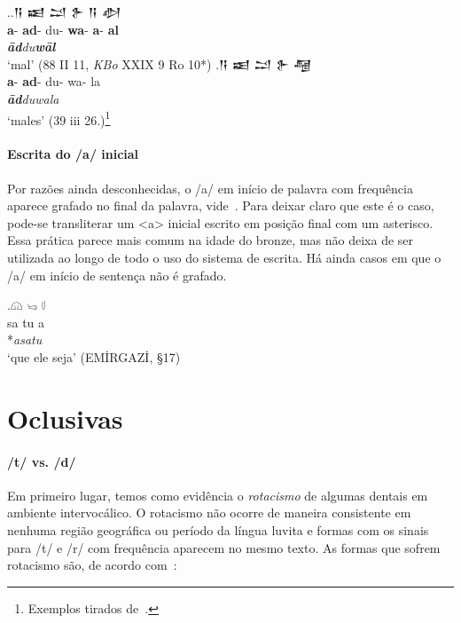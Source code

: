 \ex.\ag.\foreignlanguage{hittite}{𒀀} \foreignlanguage{hittite}{𒀜}
\foreignlanguage{hittite}{𒁺}  \foreignlanguage{hittite}{𒉿}
\foreignlanguage{hittite}{𒀀}  \foreignlanguage{hittite}{𒀠}\\
\textbf{a}- \textbf{ad}- du- \textbf{wa}- \textbf{a}- \textbf{al}\\
\emph{\textbf{ād}du\textbf{wāl}}\\
`mal' (88 II 11, \emph{KBo} XXIX 9 Ro 10*)
\bg.\foreignlanguage{hittite}{𒀀} \foreignlanguage{hittite}{𒀜}
\foreignlanguage{hittite}{𒁺}  \foreignlanguage{hittite}{𒉿}
\foreignlanguage{hittite}{𒆷}\\
\textbf{a}- \textbf{ad}- du- wa- la\\
\emph{\textbf{ād}duwala}\\
`males' (39 iii 26.)\footnote{Exemplos tirados de~\citet{Melchert1993}.}

\paragraph{Escrita do /a/ inicial} Por razões ainda desconhecidas, o /a/ em
início de palavra com frequência aparece grafado no final da palavra,
vide~\Next. Para deixar claro que este é o caso, pode-se transliterar um <a>
inicial escrito em posição final com um asterisco.
Essa prática parece mais comum na idade do bronze, mas não deixa de ser
utilizada ao longo de todo o uso do sistema de escrita.
Há ainda casos em que o /a/ em início de sentença não é grafado.

\exg.\Large 𔗔 \Large  𔑢 \Large 𔗷\\
sa tu a\\
*\emph{asatu}\\
`que ele seja' (EMİRGAZİ, §17)



\section{Oclusivas}

\paragraph{/t/ vs. /d/}
Em primeiro lugar, temos como evidência o \emph{rotacismo} de algumas dentais em
ambiente intervocálico.
O rotacismo não ocorre de maneira consistente em nenhuma região geográfica ou
período da língua luvita e formas com os sinais para /t/ e /r/ com frequência
aparecem no mesmo texto.
As formas que sofrem rotacismo são, de acordo
com~\citet[249--50]{MorpurgoDavies1982}:

